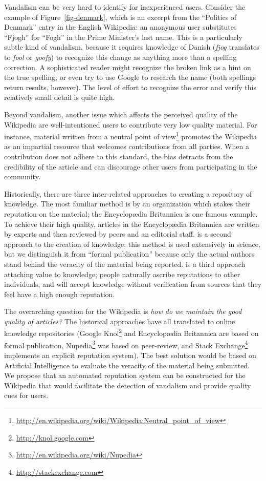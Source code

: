 Vandalism can be very hard to identify for inexperienced users.
Consider the example of Figure~\ref{fig-denmark},
which is an excerpt from the ``Politics of Denmark''
entry in the English Wikipedia: an anonymous user substitutes
``Fjogh'' for ``Fogh'' in the Prime Minister's last name.
This is a particularly subtle kind of vandalism,
because it requires knowledge of Danish
(\textit{fjog} translates to \textit{fool} or \textit{goofy})
to recognize this change as anything more than a spelling correction.
A sophisticated reader might recognize the broken link
as a hint on the true spelling, or even try to use Google
to research the name (both spellings return results, however).
The level of effort to recognize the error and
verify this relatively small detail is quite high.

Beyond vandalism, another issue which affects the perceived
quality of the Wikipedia are well-intentioned users to contribute
very low quality material.
For instance, material written from a
neutral point of view\footnote{\url{http://en.wikipedia.org/wiki/Wikipedia:Neutral_point_of_view}}
promotes the Wikipedia as an impartial resource that welcomes contributions
from all parties.
When a contribution does not adhere to this standard, the bias
detracts from the credibility of the article and can discourage
other users from participating in the community.

Historically, there are three inter-related approaches to
creating a repository of knowledge.
The most familiar method is  by an organization
which stakes their reputation on the material;
the Encyclop{\ae}dia Britannica is one famous example.
To achieve their high quality, articles in the
Encyclop{\ae}dia Britannica are written by experts
and then reviewed by peers and an editorial staff.
 is a second approach to the creation of
knowledge; this method is used extensively in science,
but we distinguish it from ``formal publication'' because
only the actual authors stand behind the veracity of the
material being reported.
 is a third approach attaching value
to knowledge; people naturally ascribe reputations to other
individuals, and will accept knowledge without verification from
sources that they feel have a high enough reputation.

The overarching question for the Wikipedia is
\textit{how do we maintain the good quality of articles?}
The historical approaches have all translated to online
knowledge repositories (\eg Google Knol\footnote{\url{http://knol.google.com}}
and Encyclop{\ae}dia Britannica
are based on formal publication,
Nupedia\footnote{\url{http://en.wikipedia.org/wiki/Nupedia} }
was based on peer-review,
and Stack Exchange\footnote{\url{http://stackexchange.com}}
implements an explicit reputation system).
The best solution would be based on Artificial Intelligence to
evaluate the veracity of the material being submitted.
We propose that an automated reputation system can be
constructed for the Wikipedia that would facilitate the
detection of vandalism and provide quality cues for users.

